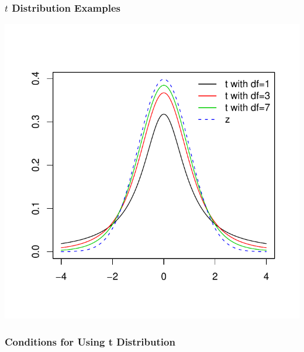 \documentclass[handout]{beamer}
\newcommand{\blue}[1]{\textcolor{blue2}{#1}}
\begin{document}
\addtocounter{framenumber}{-1}
\begin{frame}
\frametitle{$t$ Distribution Examples}
\begin{center}
\includegraphics{figure/lec16-004}
\end{center}
\end{frame}


\begin{frame}
\frametitle{Conditions for Using t Distribution}
%
%
%
	
\end{frame}
\end{document}
